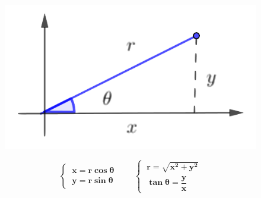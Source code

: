 \vspace{5mm}
\begin{cuadro-naranja}
\begin{multicols}{2}
	\begin{figure}[H]
	\centering
	\includegraphics[width=.3\textwidth]{img-polares/polares22.png}
	\end{figure}
	\begin{equation*} \boxed{ \  \boldsymbol{
		\begin{cases} \ x=r\cos \theta \\ \ y=r\sin \theta \end{cases} \qquad 
		\begin{cases} \ r=\sqrt{x^2+y^2} \\ \ \tan \theta=\dfrac y x \end{cases}
		} \ }
	\end{equation*}
 \end{multicols}
\end{cuadro-naranja}

\vspace{10mm}

